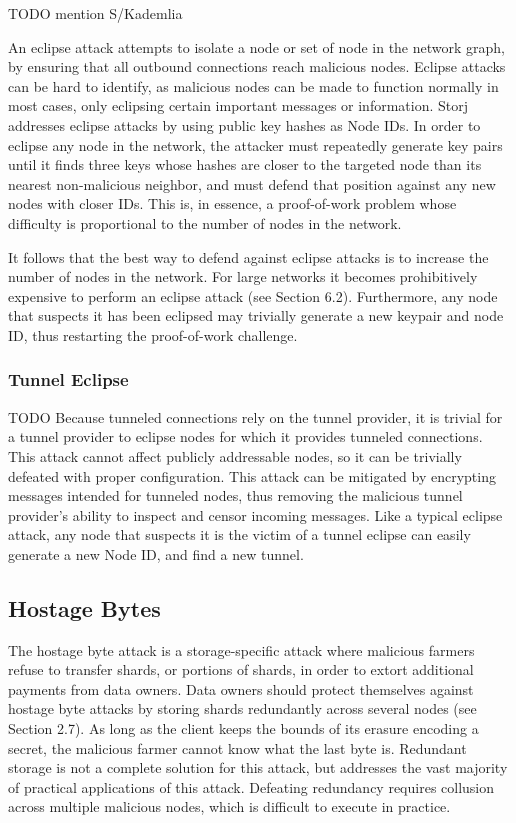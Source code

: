 \documentclass[a4paper,10pt]{article}
\newcommand{\todo}[1]{{\color{red} TODO #1}}
\begin{document}
\todo{mention S/Kademlia

An eclipse attack attempts to isolate a node or set of node in the network
graph, by ensuring that all outbound connections reach malicious nodes. Eclipse
attacks can be hard to identify, as malicious nodes can be made to function
normally in most cases, only eclipsing certain important messages or
information. Storj addresses eclipse attacks by using public key hashes as Node
IDs. In order to eclipse any node in the network, the attacker must repeatedly
generate key pairs until it finds three keys whose hashes are closer to the
targeted node than its nearest non-malicious neighbor, and must defend that
position against any new nodes with closer IDs. This is, in essence, a
proof-of-work problem whose difficulty is proportional to the number of nodes in
the network.

It follows that the best way to defend against eclipse attacks is to increase
the number of nodes in the network. For large networks it becomes prohibitively
expensive to perform an eclipse attack (see Section 6.2). Furthermore, any node
that suspects it has been eclipsed may trivially generate a new keypair and node
ID, thus restarting the proof-of-work challenge.
}

\subsubsection{Tunnel Eclipse}

\todo{
Because tunneled connections rely on the tunnel provider, it is trivial for a
tunnel provider to eclipse nodes for which it provides tunneled connections.
This attack cannot affect publicly addressable nodes, so it can be trivially
defeated with proper configuration. This attack can be mitigated by encrypting
messages intended for tunneled nodes, thus removing the malicious tunnel
provider's ability to inspect and censor incoming messages. Like a typical
eclipse attack, any node that suspects it is the victim of a tunnel eclipse can
easily generate a new Node ID, and find a new tunnel.
}

\subsection{Hostage Bytes}

The hostage byte attack is a storage-specific attack where malicious farmers
refuse to transfer shards, or portions of shards, in order to extort additional
payments from data owners. Data owners should protect themselves against hostage
byte attacks by storing shards redundantly across several nodes (see Section
2.7). As long as the client keeps the bounds of its erasure encoding a secret,
the malicious farmer cannot know what the last byte is. Redundant storage is not
a complete solution for this attack, but addresses the vast majority of
practical applications of this attack. Defeating redundancy requires collusion
across multiple malicious nodes, which is difficult to execute in practice.
\end{document}
